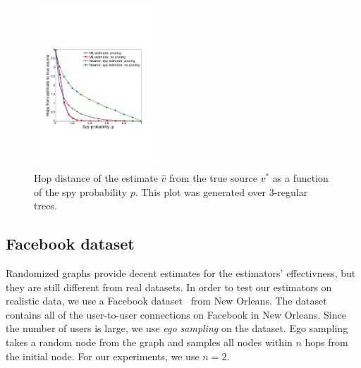 \begin{figure}
\centering
\includegraphics[height = 2.4in]{figures/hops_vs_spies}
\caption{Hop distance of the estimate $\hat v$ from the true source $v^*$ as a function of the spy probability $p$. This plot was generated over 3-regular trees. %
}
\label{fig:hops_vs_spies}
\end{figure}

\subsection{Facebook dataset}

Randomized graphs provide decent estimates for the estimators' effectivness, but they are still different from real datasets. In order to test our estimators on realistic data, we use a Facebook dataset~\cite{viswanath-2009-activity} from New Orleans. The dataset contains all of the user-to-user connections on Facebook in New Orleans. Since the number of users is large, we use \emph{ego sampling} on the dataset. Ego sampling takes a random node from the graph and samples all nodes within $n$ hops from the initial node. For our experiments, we use $n = 2$.
